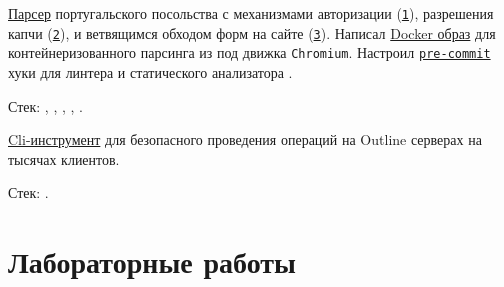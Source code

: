 \documentclass[margin,line]{resume}
\begin{document}
\begin{resume}
\begin{description}
\begin{list2}
        \item{
            \href{https://github.com/alchemmist/portu-hack}{Парсер}
            португальского посольства с механизмами авторизации
            (\href{https://github.com/alchemmist/portu-hack/blob/develop/parser/parser/searcher/auth.py}{\texttt{1}}),
            разрешения капчи
            (\href{https://github.com/alchemmist/portu-hack/blob/develop/parser/parser/searcher/captcha.py}{\texttt{2}}),
            и
            ветвящимся обходом форм на сайте
            (\href{https://github.com/alchemmist/portu-hack/blob/develop/parser/parser/searcher/snif.py}{\texttt{3}}).
            Написал
            \href{https://github.com/alchemmist/portu-hack/blob/develop/parser/Dockerfile}{Docker
            образ} для контейнеризованного парсинга
             из под движка \texttt{Chromium}.
            Настроил
            \href{https://github.com/alchemmist/portu-hack/blob/develop/pre-commit-config.yaml}{\texttt{pre-commit}}
            хуки для линтера
             и статического анализатора .

            Стек: , ,
            ,
            ,
          .}

          \vspace{2mm}

        \item{
            \href{https://github.com/alchemmist/outline-vpn-cli}{Cli-инструмент}
            для безопасного проведения операций на
            Outline серверах на тысячах клиентов.

          Стек: .}
        \end{list2}

    \end{description}

    \section{\mysidestyle Лабораторные работы}\vspace{2mm}

    \begin{description}


\end{description}
\end{resume}
\end{document}
